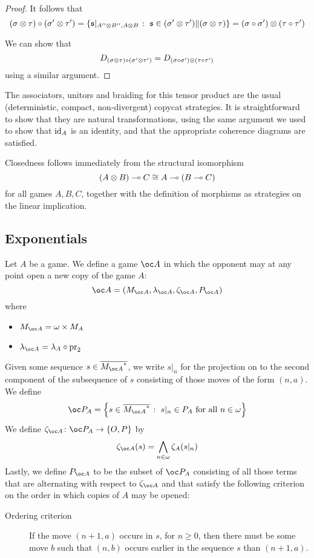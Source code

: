 \documentclass{entcs} \usepackage{prentcsmacro}
\newcommand{\0}{{\mathtt{0}}}
\begin{document}
\begin{proof}
    It follows that
    \[
      (\sigma\otimes\tau) \circ (\sigma'\otimes\tau')
      = \left\{\mathfrak s\vert_{A''\otimes B'', A\otimes B}\;\colon\;\mathfrak s\in(\sigma'\otimes\tau')\|(\sigma\otimes\tau)\right\}
      = (\sigma \circ \sigma')\otimes(\tau \circ \tau')
      \]

    We can show that
    \[
      D_{(\sigma\otimes\tau) \circ (\sigma'\otimes\tau')} = D_{(\sigma \circ \sigma')\otimes(\tau \circ \tau')}
      \]
    using a similar argument.
  \end{proof}

The associators, unitors and braiding for this tensor product are the usual (deterministic, compact, non-divergent) copycat strategies.  It is straightforward to show that they are natural transformations, using the same argument we used to show that $\operatorname{id}_A$ is an identity, and that the appropriate coherence diagrams are satisfied.  

Closedness follows immediately from the structural isomorphism
\[
  (A \otimes B) \multimap C \cong A \multimap (B \multimap C)
  \]
for all games $A,B,C$, together with the definition of morphisms as strategies on the linear implication.

\subsection{Exponentials}

Let $A$ be a game.  We define a game $\oc A$ in which the opponent may at any point open a new copy of the game $A$:
\[
  \oc A = (M_{\oc A}, \lambda_{\oc A}, \zeta_{\oc A}, P_{\oc A})
  \]
where
\begin{itemize}
  \item $M_{\oc A} = \omega \times M_A$
  \item $\lambda_{\oc A} = \lambda_A \circ \pr_2$
\end{itemize}

Given some sequence $s\in \seqs{M_{\oc A}}$, we write $s\vert_n$ for the projection on to the second component of the subsequence of $s$ consisting of those moves of the form $(n, a)$.  We define
\[
  \oc P_A = \left\{s\in\seqs{M_{\oc A}} \suchthat s\vert_n\in P_A \textrm{ for all $n\in\omega$}\right\}
  \]
We define $\zeta_{\oc A}\from \oc P_A\to\OP$ by
\[
  \zeta_{\oc A}(s) = \bigwedge_{n\in\omega}\zeta_A(s\vert_n)
  \]
Lastly, we define $P_{\oc A}$ to be the subset of $\oc P_A$ consisting of all those terms that are alternating with respect to $\zeta_{\oc A}$ and that satisfy the following criterion on the order in which copies of $A$ may be opened:
\begin{description}
  \item[Ordering criterion] If the move $(n + 1, a)$ occurs in $s$, for $n\ge 0$, then there must be some move $b$ such that $(n, b)$ occurs earlier in the sequence $s$ than $(n + 1, a)$.  
\end{description}
\end{document}
